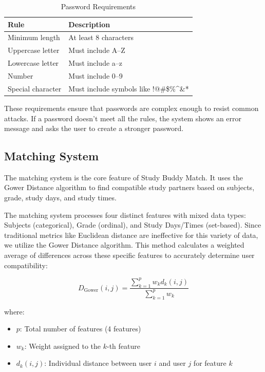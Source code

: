 \documentclass[a4paper,12pt]{report}
\begin{document}
\begin{table}[H]
\centering
\begin{tabular}{|p{4cm}|p{9cm}|}
\hline
\textbf{Rule} & \textbf{Description} \\
\hline
Minimum length & At least 8 characters \\
\hline
Uppercase letter & Must include A--Z \\
\hline
Lowercase letter & Must include a--z \\
\hline
Number & Must include 0--9 \\
\hline
Special character & Must include symbols like !@\#\$\%\^{}\&* \\
\hline
\end{tabular}
\caption{Password Requirements}
\label{tab:password_rules}
\end{table}

These requirements ensure that passwords are complex enough to resist common attacks. If a password doesn't meet all the rules, the system shows an error message and asks the user to create a stronger password.



\subsection{Matching System}

The matching system is the core feature of Study Buddy Match. It uses the Gower Distance algorithm to find compatible study partners based on subjects, grade, study days, and study times.

The matching system processes four distinct features with mixed data types: Subjects (categorical), Grade (ordinal), and Study Days/Times (set-based). Since traditional metrics like Euclidean distance are ineffective for this variety of data, we utilize the Gower Distance algorithm. This method calculates a weighted average of differences across these specific features to accurately determine user compatibility:

\[
D_{\text{Gower}}(i, j) = \frac{\sum_{k=1}^{p} w_k d_k(i, j)}{\sum_{k=1}^{p} w_k}
\]

where:
\begin{itemize}
    \item $p$: Total number of features (4 features)
    \item $w_k$: Weight assigned to the $k$-th feature
    \item $d_k(i,j)$: Individual distance between user $i$ and user $j$ for feature $k$
\end{itemize}
\end{document}

